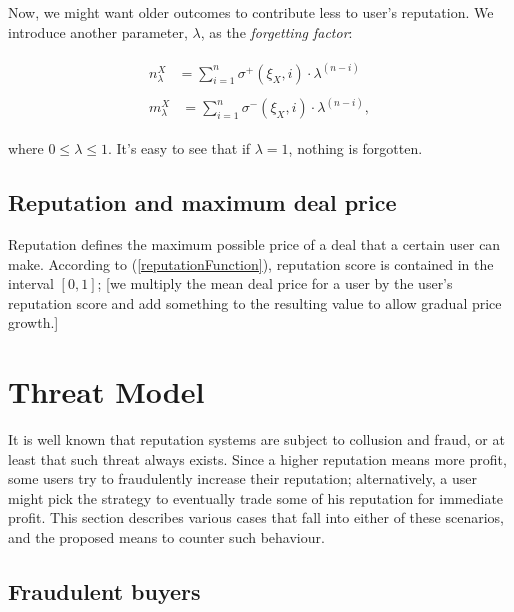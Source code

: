 \documentclass[11pt]{article}
\begin{document}
Now, we might want older outcomes to contribute less to user's reputation. We introduce another parameter, $ \lambda $, as the \textit{forgetting factor}:

\begin{align}
\begin{split}
n_{\lambda}^{X} {}& = \sum_{i = 1}^{n} \sigma^{+}(\xi_X, i) \cdot \lambda^{(n - i)}
\end{split} \\
\begin{split}
m_{\lambda}^{X} {}& = \sum_{i = 1}^{n} \sigma^{-}(\xi_X, i) \cdot \lambda^{(n - i)},
\end{split}
\end{align}

where $ 0 \leq \lambda \leq 1 $. It's easy to see that if $ \lambda = 1 $, nothing is forgotten.

\subsection{Reputation and maximum deal price} \label{reputation:maxDealprice}

Reputation defines the maximum possible price of a deal that a certain user can make. According to (\ref{reputationFunction}), reputation score is contained in the interval $ [0, 1] $; [we multiply the mean deal price for a user by the user's reputation score and add something to the resulting value to allow gradual price growth.]

\section{Threat Model} \label{threatModel}

It is well known \cite{ciccarelli2011collusion, maranzato2010fraud} that reputation systems are subject to collusion and fraud, or at least that such threat always exists. Since a higher reputation means more profit, some users try to fraudulently increase their reputation; alternatively, a user might 
pick the strategy to eventually trade some of his reputation for immediate profit. This section describes various cases that fall into either of these scenarios, and the proposed means to counter such behaviour.

\subsection{Fraudulent buyers} \label{threatModel:buyers}
\end{document}
